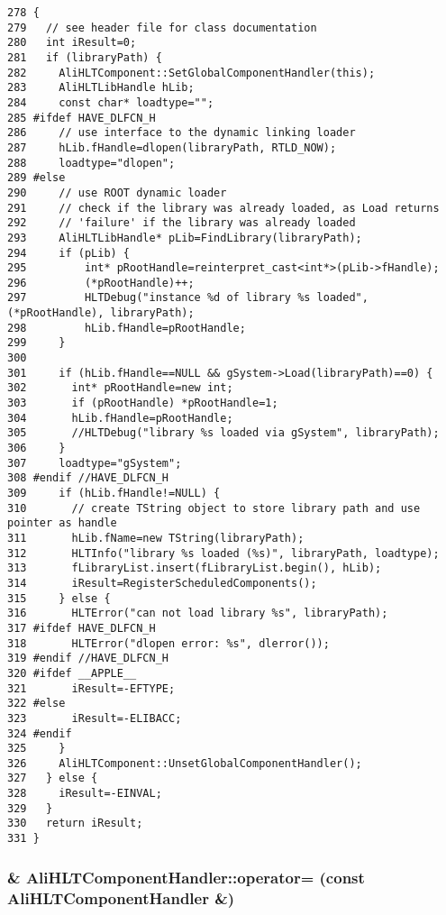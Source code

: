 \footnotesize\begin{verbatim}278 {
279   // see header file for class documentation
280   int iResult=0;
281   if (libraryPath) {
282     AliHLTComponent::SetGlobalComponentHandler(this);
283     AliHLTLibHandle hLib;
284     const char* loadtype="";
285 #ifdef HAVE_DLFCN_H
286     // use interface to the dynamic linking loader
287     hLib.fHandle=dlopen(libraryPath, RTLD_NOW);
288     loadtype="dlopen";
289 #else
290     // use ROOT dynamic loader
291     // check if the library was already loaded, as Load returns
292     // 'failure' if the library was already loaded
293     AliHLTLibHandle* pLib=FindLibrary(libraryPath);
294     if (pLib) {
295         int* pRootHandle=reinterpret_cast<int*>(pLib->fHandle);
296         (*pRootHandle)++;
297         HLTDebug("instance %d of library %s loaded", (*pRootHandle), libraryPath);
298         hLib.fHandle=pRootHandle;
299     }
300     
301     if (hLib.fHandle==NULL && gSystem->Load(libraryPath)==0) {
302       int* pRootHandle=new int;
303       if (pRootHandle) *pRootHandle=1;
304       hLib.fHandle=pRootHandle;
305       //HLTDebug("library %s loaded via gSystem", libraryPath);
306     }
307     loadtype="gSystem";
308 #endif //HAVE_DLFCN_H
309     if (hLib.fHandle!=NULL) {
310       // create TString object to store library path and use pointer as handle 
311       hLib.fName=new TString(libraryPath);
312       HLTInfo("library %s loaded (%s)", libraryPath, loadtype);
313       fLibraryList.insert(fLibraryList.begin(), hLib);
314       iResult=RegisterScheduledComponents();
315     } else {
316       HLTError("can not load library %s", libraryPath);
317 #ifdef HAVE_DLFCN_H
318       HLTError("dlopen error: %s", dlerror());
319 #endif //HAVE_DLFCN_H
320 #ifdef __APPLE__
321       iResult=-EFTYPE;
322 #else
323       iResult=-ELIBACC;
324 #endif
325     }
326     AliHLTComponent::UnsetGlobalComponentHandler();
327   } else {
328     iResult=-EINVAL;
329   }
330   return iResult;
331 }
\end{verbatim}\normalsize 


\subsubsection{ \& Ali\-HLTComponent\-Handler::operator= (const {\bf Ali\-HLTComponent\-Handler} \&)}\label{classAliHLTComponentHandler_a3}


